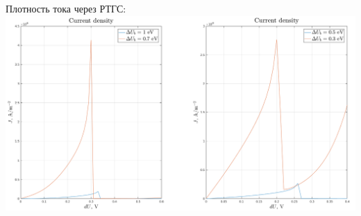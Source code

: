 \documentclass[10pt,pdf,hyperref={unicode},aspectratio={169}]{beamer}
\begin{document}
\begin{frame}
\begin{columns}
		{\color{red} Плотность тока через РТГС:}\\
	   	\includegraphics[width=.8\linewidth,center]{assets/qbhj}
	\end{columns}
\end{frame}
\end{document}
